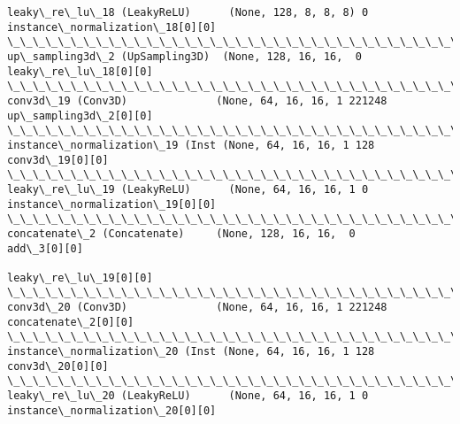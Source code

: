 \documentclass[11pt]{article}
\begin{document}
\begin{Verbatim}[commandchars=\\\{\}]
leaky\_re\_lu\_18 (LeakyReLU)      (None, 128, 8, 8, 8) 0           instance\_normalization\_18[0][0]  
\_\_\_\_\_\_\_\_\_\_\_\_\_\_\_\_\_\_\_\_\_\_\_\_\_\_\_\_\_\_\_\_\_\_\_\_\_\_\_\_\_\_\_\_\_\_\_\_\_\_\_\_\_\_\_\_\_\_\_\_\_\_\_\_\_\_\_\_\_\_\_\_\_\_\_\_\_\_\_\_\_\_\_\_\_\_\_\_\_\_\_\_\_\_\_\_\_\_
up\_sampling3d\_2 (UpSampling3D)  (None, 128, 16, 16,  0           leaky\_re\_lu\_18[0][0]             
\_\_\_\_\_\_\_\_\_\_\_\_\_\_\_\_\_\_\_\_\_\_\_\_\_\_\_\_\_\_\_\_\_\_\_\_\_\_\_\_\_\_\_\_\_\_\_\_\_\_\_\_\_\_\_\_\_\_\_\_\_\_\_\_\_\_\_\_\_\_\_\_\_\_\_\_\_\_\_\_\_\_\_\_\_\_\_\_\_\_\_\_\_\_\_\_\_\_
conv3d\_19 (Conv3D)              (None, 64, 16, 16, 1 221248      up\_sampling3d\_2[0][0]            
\_\_\_\_\_\_\_\_\_\_\_\_\_\_\_\_\_\_\_\_\_\_\_\_\_\_\_\_\_\_\_\_\_\_\_\_\_\_\_\_\_\_\_\_\_\_\_\_\_\_\_\_\_\_\_\_\_\_\_\_\_\_\_\_\_\_\_\_\_\_\_\_\_\_\_\_\_\_\_\_\_\_\_\_\_\_\_\_\_\_\_\_\_\_\_\_\_\_
instance\_normalization\_19 (Inst (None, 64, 16, 16, 1 128         conv3d\_19[0][0]                  
\_\_\_\_\_\_\_\_\_\_\_\_\_\_\_\_\_\_\_\_\_\_\_\_\_\_\_\_\_\_\_\_\_\_\_\_\_\_\_\_\_\_\_\_\_\_\_\_\_\_\_\_\_\_\_\_\_\_\_\_\_\_\_\_\_\_\_\_\_\_\_\_\_\_\_\_\_\_\_\_\_\_\_\_\_\_\_\_\_\_\_\_\_\_\_\_\_\_
leaky\_re\_lu\_19 (LeakyReLU)      (None, 64, 16, 16, 1 0           instance\_normalization\_19[0][0]  
\_\_\_\_\_\_\_\_\_\_\_\_\_\_\_\_\_\_\_\_\_\_\_\_\_\_\_\_\_\_\_\_\_\_\_\_\_\_\_\_\_\_\_\_\_\_\_\_\_\_\_\_\_\_\_\_\_\_\_\_\_\_\_\_\_\_\_\_\_\_\_\_\_\_\_\_\_\_\_\_\_\_\_\_\_\_\_\_\_\_\_\_\_\_\_\_\_\_
concatenate\_2 (Concatenate)     (None, 128, 16, 16,  0           add\_3[0][0]                      
                                                                 leaky\_re\_lu\_19[0][0]             
\_\_\_\_\_\_\_\_\_\_\_\_\_\_\_\_\_\_\_\_\_\_\_\_\_\_\_\_\_\_\_\_\_\_\_\_\_\_\_\_\_\_\_\_\_\_\_\_\_\_\_\_\_\_\_\_\_\_\_\_\_\_\_\_\_\_\_\_\_\_\_\_\_\_\_\_\_\_\_\_\_\_\_\_\_\_\_\_\_\_\_\_\_\_\_\_\_\_
conv3d\_20 (Conv3D)              (None, 64, 16, 16, 1 221248      concatenate\_2[0][0]              
\_\_\_\_\_\_\_\_\_\_\_\_\_\_\_\_\_\_\_\_\_\_\_\_\_\_\_\_\_\_\_\_\_\_\_\_\_\_\_\_\_\_\_\_\_\_\_\_\_\_\_\_\_\_\_\_\_\_\_\_\_\_\_\_\_\_\_\_\_\_\_\_\_\_\_\_\_\_\_\_\_\_\_\_\_\_\_\_\_\_\_\_\_\_\_\_\_\_
instance\_normalization\_20 (Inst (None, 64, 16, 16, 1 128         conv3d\_20[0][0]                  
\_\_\_\_\_\_\_\_\_\_\_\_\_\_\_\_\_\_\_\_\_\_\_\_\_\_\_\_\_\_\_\_\_\_\_\_\_\_\_\_\_\_\_\_\_\_\_\_\_\_\_\_\_\_\_\_\_\_\_\_\_\_\_\_\_\_\_\_\_\_\_\_\_\_\_\_\_\_\_\_\_\_\_\_\_\_\_\_\_\_\_\_\_\_\_\_\_\_
leaky\_re\_lu\_20 (LeakyReLU)      (None, 64, 16, 16, 1 0           instance\_normalization\_20[0][0]  

\end{Verbatim}
\end{document}
